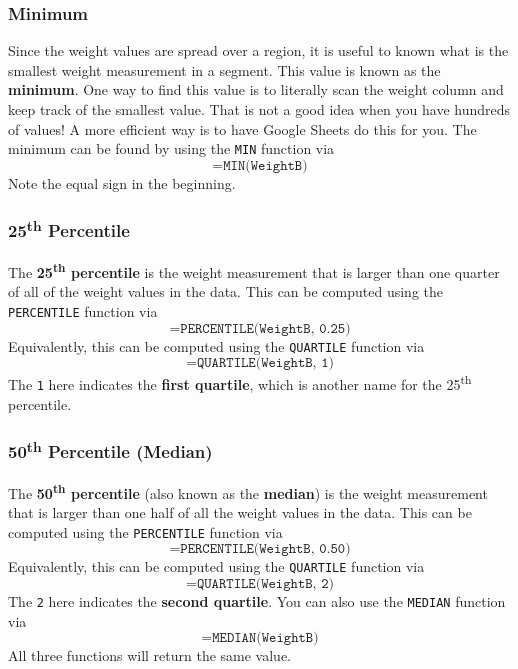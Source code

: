 \subsubsection{Minimum}
%
Since the weight values are spread over a region, it is useful to known what is the smallest weight measurement in a segment. This value is known as the \textbf{minimum}. One way to find this value is to literally scan the weight column and keep track of the smallest value. That is not a good idea when you have hundreds of values! A more efficient way is to have Google Sheets do this for you. The minimum can be found by using the \texttt{MIN} function via
\begin{equation}
    \texttt{=MIN(WeightB)}
    \label{eq:00.min}
\end{equation}
Note the equal sign in the beginning.
%
\subsubsection{25\textsuperscript{th} Percentile}
%
The \textbf{25\textsuperscript{th} percentile} is the weight measurement that is larger than one quarter of all of the weight values in the data. This can be computed using the \texttt{PERCENTILE} function via
\begin{equation}
    \texttt{=PERCENTILE(WeightB, 0.25)}
    \label{eq:00.percentile.25}
\end{equation}
Equivalently, this can be computed using the \texttt{QUARTILE} function via
\begin{equation}
    \texttt{=QUARTILE(WeightB, 1)}
\end{equation}
The \texttt{1} here indicates the \textbf{first quartile}, which is another name for the 25\textsuperscript{th} percentile.
%
\subsubsection{50\textsuperscript{th} Percentile (Median)}
%
The \textbf{50\textsuperscript{th} percentile} (also known as the \textbf{median}) is the weight measurement that is larger than one half of all the weight values in the data. This can be computed using the \texttt{PERCENTILE} function via
\begin{equation}
    \texttt{=PERCENTILE(WeightB, 0.50)}
    \label{eq:00.percentile.50}
\end{equation}
Equivalently, this can be computed using the \texttt{QUARTILE} function via
\begin{equation}
    \texttt{=QUARTILE(WeightB, 2)}
\end{equation}
The \texttt{2} here indicates the \textbf{second quartile}. You can also use the \texttt{MEDIAN} function via
\begin{equation}
    \texttt{=MEDIAN(WeightB)}
    \label{eq:00.median}
\end{equation}
All three functions will return the same value.
%
